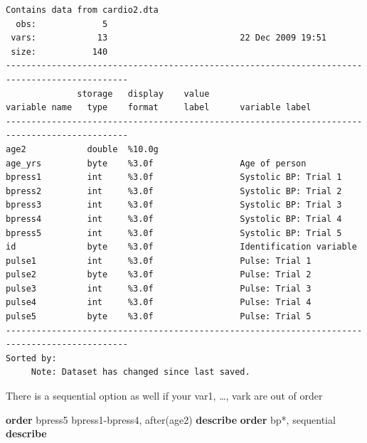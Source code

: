 \documentclass[
]{book}
\newenvironment{Shaded}{\begin{snugshade}}{\end{snugshade}}
\newcommand{\KeywordTok}[1]{\textcolor[rgb]{0.13,0.29,0.53}{\textbf{#1}}}
\newcommand{\NormalTok}[1]{#1}
\begin{document}
\begin{verbatim}
Contains data from cardio2.dta
  obs:             5                          
 vars:            13                          22 Dec 2009 19:51
 size:           140                          
----------------------------------------------------------------------------------------------
              storage   display    value
variable name   type    format     label      variable label
----------------------------------------------------------------------------------------------
age2            double  %10.0g                
age_yrs         byte    %3.0f                 Age of person
bpress1         int     %3.0f                 Systolic BP: Trial 1
bpress2         int     %3.0f                 Systolic BP: Trial 2
bpress3         int     %3.0f                 Systolic BP: Trial 3
bpress4         int     %3.0f                 Systolic BP: Trial 4
bpress5         int     %3.0f                 Systolic BP: Trial 5
id              byte    %3.0f                 Identification variable
pulse1          int     %3.0f                 Pulse: Trial 1
pulse2          byte    %3.0f                 Pulse: Trial 2
pulse3          int     %3.0f                 Pulse: Trial 3
pulse4          int     %3.0f                 Pulse: Trial 4
pulse5          byte    %3.0f                 Pulse: Trial 5
----------------------------------------------------------------------------------------------
Sorted by: 
     Note: Dataset has changed since last saved.
\end{verbatim}

There is a sequential option as well if your var1, \ldots, vark are out of order

\begin{Shaded}
\begin{Highlighting}[]
\KeywordTok{order}\NormalTok{ bpress5 bpress1{-}bpress4, after(age2)}
\KeywordTok{describe}
\KeywordTok{order}\NormalTok{ bp*, sequential}
\KeywordTok{describe}
\end{Highlighting}
\end{Shaded}
\end{document}
